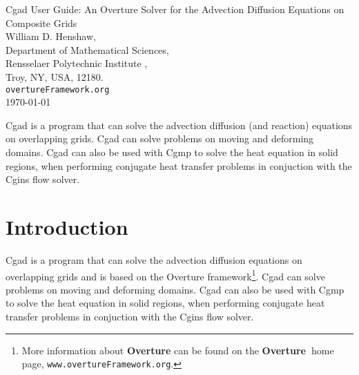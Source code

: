 \documentclass[11pt]{article}
\newcommand{\Overture}{{\bf Overture\ }}
\begin{document}


\def\ud     {{    U}}
\def\pd     {{    P}}

\newcommand{\mbar}{\bar{m}}
\newcommand{\Rbar}{\bar{R}}
\newcommand{\Ru}{R_u}         %
\newcommand{\Div}{\grad\cdot}
\newcommand{\tauv}{\boldsymbol{\tau}}
\newcommand{\sumi}{\sum_{i=1}^n}
\newcommand{\dt}{{\Delta t}}
\newcommand{\eps}{\epsilon}

\baselineskip
\begin{flushleft}
{\Large
Cgad User Guide: An Overture Solver for the Advection Diffusion Equations on Composite Grids \\
}
\vspace{2\baselineskip}
William D. Henshaw,  \\
Department of Mathematical Sciences,  \\
Rensselaer Polytechnic Institute ,    \\
Troy, NY, USA, 12180.  \\
{\tt overtureFramework.org} \\
\vspace{\baselineskip}
\today\\
\vspace{\baselineskip}

\vspace{4\baselineskip}


Cgad is a program that can solve the advection diffusion (and reaction) equations on overlapping grids.
Cgad can solve problems on moving and deforming domains.
Cgad can also be used with Cgmp to solve the heat equation in solid regions, when performing conjugate heat
transfer problems in conjuction with the Cgins flow solver.


\end{flushleft}

\tableofcontents


\vfill\eject

\section{Introduction}

   Cgad is a program that can solve the advection diffusion equations on overlapping grids and is based
on the Overture framework\footnote{More information about
{\bf Overture} can be found on the \Overture home page, {\tt www.overtureFramework.org}.}.
Cgad can solve problems on moving and deforming domains.
Cgad can also be used with Cgmp to solve the heat equation in solid regions, when performing conjugate heat
transfer problems in conjuction with the Cgins flow solver.
\end{document}
